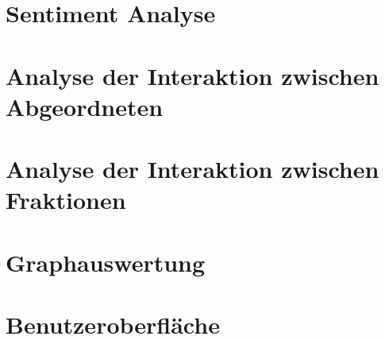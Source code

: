 \documentclass[a4paper,12pt,twoside]{book}
\begin{document}
\chapter{Sentiment Analyse}






\chapter{Analyse der Interaktion zwischen Abgeordneten}






\chapter{Analyse der Interaktion zwischen Fraktionen}






\chapter{Graphauswertung}






\chapter{Benutzeroberfläche}






\setcounter{page}{6}

\printbibliography[title={Literaturverzeichnis}]
\newpage

\printglossaries
{}
\newpage
\end{document}
